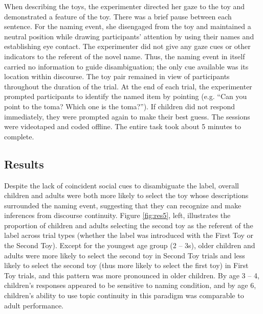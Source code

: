 \documentclass[man]{apa2}
\begin{document}
When describing the toys, the experimenter directed her gaze to the toy and demonstrated a feature of the toy.  There was a brief pause between each sentence.  For the naming event, she disengaged from the toy and maintained a neutral position while drawing participants' attention by using their names and establishing eye contact.  The experimenter did not give any gaze cues or other indicators to the referent of the novel name.  Thus, the naming event in itself carried no information to guide disambiguation; the only cue available was its location within discourse.  The toy pair remained in view of participants throughout the duration of the trial.  At the end of each trial, the experimenter prompted participants to identify the named item by pointing (e.g. ``Can you point to the toma? Which one is the toma?'').  If children did not respond immediately, they were prompted again to make their best guess. The sessions were videotaped and coded offline. The entire task took about 5 minutes to complete. 


 

\subsection{Results}

Despite the lack of coincident social cues to disambiguate the label, overall children and adults were both more likely to select the toy whose descriptions surrounded the naming event, suggesting that they can recognize and make inferences from discourse continuity.  Figure \ref{fig:res5}, left, illustrates the proportion of children and adults selecting the second toy as the referent of the label across trial types (whether the label was introduced with the First Toy or the Second Toy).  Except for the youngest age group (2 -- 3s), older children and adults were more likely to select the second toy in Second Toy trials and less likely to select the second toy (thus more likely to select the first toy) in First Toy trials, and this pattern was more pronounced in older children. By age 3 -- 4, children's responses appeared to be sensitive to naming condition, and by age 6, children's ability to use topic continuity in this paradigm was comparable to adult performance.
\end{document}

